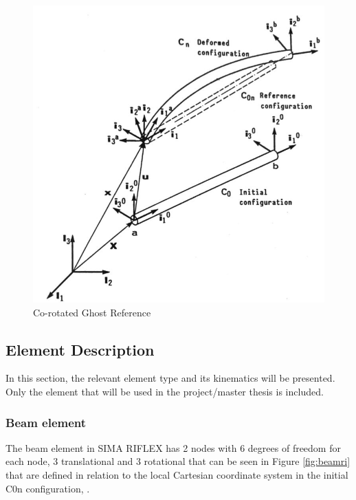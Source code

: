 \begin{figure}[H]
\centering
\includegraphics[scale=0.5]{figures/coro}
\caption[$\; \:$Co-rotated Ghost Reference]{Co-rotated Ghost Reference \cite{Mathisen1990} }
 \label{fig:coro}
\end{figure}

\subsection{Element Description}
In this section, the relevant element type and its kinematics will be presented. Only  the element that will be used in the project/master thesis is included. 
\subsubsection{Beam element}
\noindent The beam element in SIMA RIFLEX has 2 nodes with 6 degrees of freedom for each node, 3 translational and 3 rotational that can be seen in Figure \ref{fig:beamri} that are defined in relation to the local Cartesian coordinate system in the initial C0n configuration,
\cite{sintef2017}.


